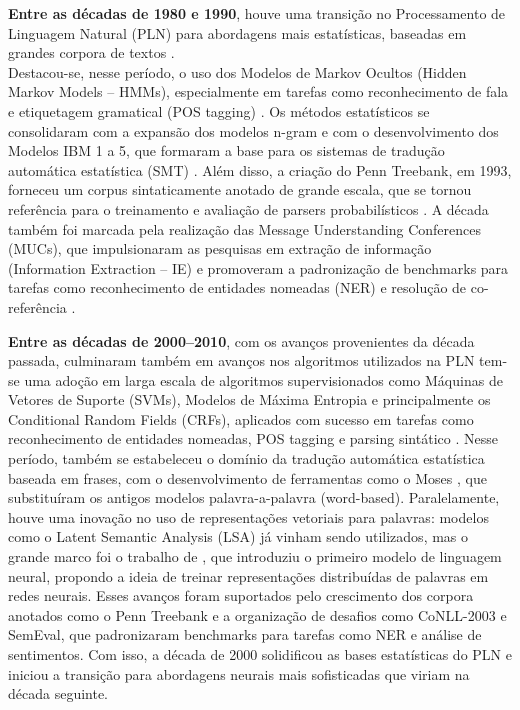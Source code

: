 \textbf{Entre as décadas de 1980 e 1990}, houve uma transição no Processamento de Linguagem Natural (PLN) para abordagens mais estatísticas, baseadas em grandes corpora de textos \cite{jurafsky2023slp3}. \\Destacou-se, nesse período, o uso dos Modelos de Markov Ocultos (Hidden Markov Models – HMMs), especialmente em tarefas como reconhecimento de fala e etiquetagem gramatical (POS tagging) \cite{jelinek1997statistical}. Os métodos estatísticos se consolidaram com a expansão dos modelos n-gram e com o desenvolvimento dos Modelos IBM 1 a 5, que formaram a base para os sistemas de tradução automática estatística (SMT) \cite{brown1993mathematics}. Além disso, a criação do Penn Treebank, em 1993, forneceu um corpus sintaticamente anotado de grande escala, que se tornou referência para o treinamento e avaliação de parsers probabilísticos \cite{marcus1993treebank}. A década também foi marcada pela realização das Message Understanding Conferences (MUCs), que impulsionaram as pesquisas em extração de informação (Information Extraction – IE) e promoveram a padronização de benchmarks para tarefas como reconhecimento de entidades nomeadas (NER) e resolução de co-referência \cite{grishman1996muc6}.

\textbf{Entre as décadas de 2000–2010}, com os avanços provenientes da década passada, culminaram também em avanços nos algoritmos utilizados na PLN
    tem-se uma adoção em larga escala de algoritmos supervisionados como Máquinas de Vetores de Suporte (SVMs), Modelos de Máxima Entropia e principalmente os Conditional Random Fields (CRFs), aplicados com sucesso em tarefas como reconhecimento de entidades nomeadas, POS tagging e parsing sintático \cite{lafferty2001crf}. Nesse período, também se estabeleceu o domínio da tradução automática estatística baseada em frases, com o desenvolvimento de ferramentas como o Moses \cite{koehn2007moses}, que substituíram os antigos modelos palavra-a-palavra (word-based). Paralelamente, houve uma inovação no uso de representações vetoriais para palavras: modelos como o Latent Semantic Analysis (LSA) já vinham sendo utilizados, mas o grande marco foi o trabalho de \textcite{bengio2003neural}, que introduziu o primeiro modelo de linguagem neural, propondo a ideia de treinar representações distribuídas de palavras em redes neurais. Esses avanços foram suportados pelo crescimento dos corpora anotados como o Penn Treebank e a organização de desafios como CoNLL-2003 e SemEval, que padronizaram benchmarks para tarefas como NER e análise de sentimentos. Com isso, a década de 2000 solidificou as bases estatísticas do PLN e iniciou a transição para abordagens neurais mais sofisticadas que viriam na década seguinte.

